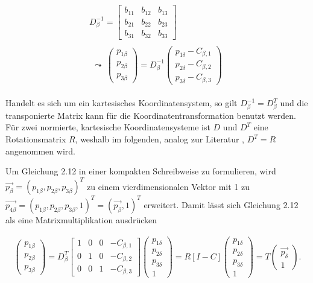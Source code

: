 \begin{gather}
	D_\beta^{-1} = 
	\begin{bmatrix}b_{11} & b_{12} & b_{13}\\
		b_{21} & b_{22} & b_{23}\\
		b_{31} & b_{32} & b_{33}
	\end{bmatrix} \\
	\begin{split}
		\leadsto \: \begin{pmatrix}
			p_{1\beta}\\p_{2\beta}\\ p_{3\beta}
		\end{pmatrix}
		= D_\beta^{-1} 
		\begin{pmatrix}
			p_{1\delta} - C_{\beta,1}\\
			p_{2\delta} - C_{\beta,2}\\
			p_{3\delta} - C_{\beta,3}
		\end{pmatrix}
	\end{split} 
\end{gather}

Handelt es sich um ein kartesisches Koordinatensystem, so gilt $\ensuremath{D_\beta^{-1}}=D_\beta^{T}$ und die transponierte Matrix kann für die Koordinatentransformation benutzt werden. Für zwei normierte, kartesische Koordinatensysteme ist $D$ und $D^T$ eine Rotationsmatrix $R$, weshalb im folgenden, analog zur Literatur \cite{HZ,Elements,Ferid}, $D^T=R$ angenommen wird.  

Um Gleichung 2.12 in einer kompakten Schreibweise zu formulieren, wird $\vec{p_{\beta}}=(p_{1\beta},p_{2\beta},p_{3\beta})^T$ zu einem vierdimensionalen Vektor mit 1 zu
$\vec{p_{4\beta}}=(p_{1\beta},p_{2\beta},p_{3\beta},1)^T=(\vec{p_{\beta}},1)^T$ erweitert. Damit lässt sich Gleichung 2.12 als eine Matrixmultiplikation ausdrücken

\begin{gather}
 \begin{pmatrix}
		p_{1\beta}\\p_{2\beta}\\ p_{3\beta}
		\end{pmatrix}
		= D_\beta^T	
		\begin{bmatrix}1 & 0 & 0 & - C_{\beta,1}\\
			0 & 1 & 0& - C_{\beta,2}\\
			0 & 0 & 1 & - C_{\beta,3}
		\end{bmatrix} 
	 \begin{pmatrix}
		p_{1\delta}\\p_{2\delta}\\ p_{3\delta}\\1
	\end{pmatrix}
	= R	[I -C] 	 \begin{pmatrix}
		p_{1\delta}\\p_{2\delta}\\ p_{3\delta}\\1
	\end{pmatrix}
= T	\begin{pmatrix}
\vec{p_\delta}\\1
\end{pmatrix}.	 \label{eq:trafo}
\end{gather}

